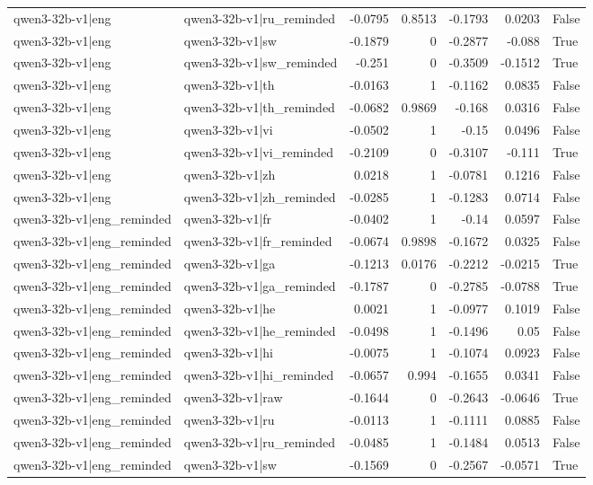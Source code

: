 \begin{table}
\begin{tabular}{l l r r r r l}
qwen3-32b-v1|eng & qwen3-32b-v1|ru_reminded & -0.0795 & 0.8513 & -0.1793 & 0.0203 & False \\
qwen3-32b-v1|eng & qwen3-32b-v1|sw & -0.1879 & 0 & -0.2877 & -0.088 & True \\
qwen3-32b-v1|eng & qwen3-32b-v1|sw_reminded & -0.251 & 0 & -0.3509 & -0.1512 & True \\
qwen3-32b-v1|eng & qwen3-32b-v1|th & -0.0163 & 1 & -0.1162 & 0.0835 & False \\
qwen3-32b-v1|eng & qwen3-32b-v1|th_reminded & -0.0682 & 0.9869 & -0.168 & 0.0316 & False \\
qwen3-32b-v1|eng & qwen3-32b-v1|vi & -0.0502 & 1 & -0.15 & 0.0496 & False \\
qwen3-32b-v1|eng & qwen3-32b-v1|vi_reminded & -0.2109 & 0 & -0.3107 & -0.111 & True \\
qwen3-32b-v1|eng & qwen3-32b-v1|zh & 0.0218 & 1 & -0.0781 & 0.1216 & False \\
qwen3-32b-v1|eng & qwen3-32b-v1|zh_reminded & -0.0285 & 1 & -0.1283 & 0.0714 & False \\
qwen3-32b-v1|eng_reminded & qwen3-32b-v1|fr & -0.0402 & 1 & -0.14 & 0.0597 & False \\
qwen3-32b-v1|eng_reminded & qwen3-32b-v1|fr_reminded & -0.0674 & 0.9898 & -0.1672 & 0.0325 & False \\
qwen3-32b-v1|eng_reminded & qwen3-32b-v1|ga & -0.1213 & 0.0176 & -0.2212 & -0.0215 & True \\
qwen3-32b-v1|eng_reminded & qwen3-32b-v1|ga_reminded & -0.1787 & 0 & -0.2785 & -0.0788 & True \\
qwen3-32b-v1|eng_reminded & qwen3-32b-v1|he & 0.0021 & 1 & -0.0977 & 0.1019 & False \\
qwen3-32b-v1|eng_reminded & qwen3-32b-v1|he_reminded & -0.0498 & 1 & -0.1496 & 0.05 & False \\
qwen3-32b-v1|eng_reminded & qwen3-32b-v1|hi & -0.0075 & 1 & -0.1074 & 0.0923 & False \\
qwen3-32b-v1|eng_reminded & qwen3-32b-v1|hi_reminded & -0.0657 & 0.994 & -0.1655 & 0.0341 & False \\
qwen3-32b-v1|eng_reminded & qwen3-32b-v1|raw & -0.1644 & 0 & -0.2643 & -0.0646 & True \\
qwen3-32b-v1|eng_reminded & qwen3-32b-v1|ru & -0.0113 & 1 & -0.1111 & 0.0885 & False \\
qwen3-32b-v1|eng_reminded & qwen3-32b-v1|ru_reminded & -0.0485 & 1 & -0.1484 & 0.0513 & False \\
qwen3-32b-v1|eng_reminded & qwen3-32b-v1|sw & -0.1569 & 0 & -0.2567 & -0.0571 & True \\

\end{tabular}
\end{table}
